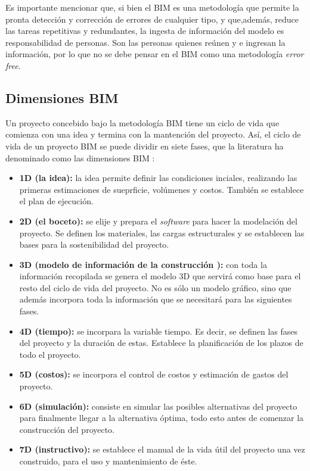 Es importante mencionar que, si bien el BIM es una metodología que permite la pronta detección y corrección de errores de cualquier tipo, y que,además, reduce las tareas repetitivas y redundantes, la ingesta de información del modelo es responsabilidad de personas. Son las personas quienes reúnen y e ingresan la información, por lo que no se debe pensar en el BIM como una metodología \textit{error free}.


\subsection{Dimensiones BIM}

Un proyecto concebido bajo la metodología BIM tiene un ciclo de vida que comienza con una idea y termina con la mantención del proyecto. Así, el ciclo de vida de un proyecto BIM se puede dividir en siete fases, que la literatura ha denominado como las dimensiones BIM \cite{tabilo2019estudio}:

\begin{itemize}
    \item \textbf{1D (la idea):} la idea permite definir las condiciones inciales, realizando las primeras estimaciones de sueprficie, volúmenes y costos. También se establece el plan de ejecución.
    \item \textbf{2D (el boceto):} se elije y prepara el \textit{software} para hacer la modelación del proyecto. Se definen los materiales, las cargas estructurales y se establecen las bases para la sostenibilidad del proyecto.
    \item \textbf{3D (modelo de información de la construcción
    ):} con toda la información recopilada se genera el modelo 3D que servirá como base para el resto del ciclo de vida del proyecto. No es sólo un modelo gráfico, sino que además incorpora toda la información que se necesitará para las siguientes fases.
    \item \textbf{4D (tiempo):} se incorpara la variable tiempo. Es decir, se definen las fases del proyecto y la duración de estas. Establece la planificación de los plazos de todo el proyecto.
    \item \textbf{5D (costos):} se incorpora el control de costos y estimación de gastos del proyecto.
    \item \textbf{6D (simulación):} consiste en simular las posibles alternativas del proyecto para finalmente llegar a la alternativa óptima, todo esto antes de comenzar la construcción del proyecto.
    \item \textbf{7D (instructivo):} se establece el manual de la vida útil del proyecto una vez construido, para el uso y mantenimiento de éste.
\end{itemize}


